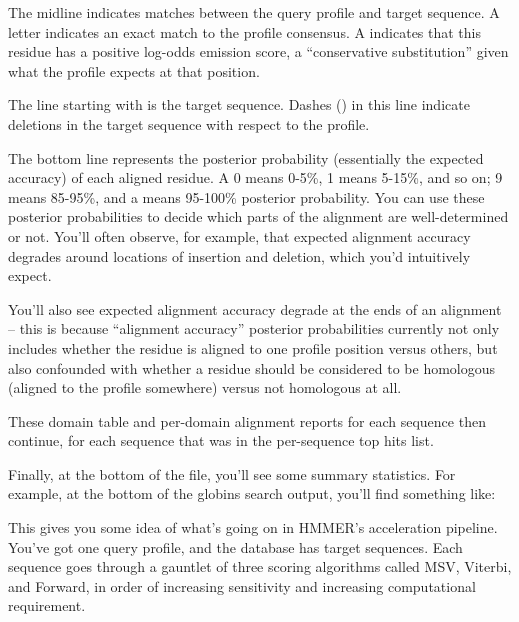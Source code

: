The midline indicates matches between the query profile and target
sequence. A letter indicates an exact match to the profile consensus.
A \mono{+} indicates that this residue has a positive log-odds
emission score, a ``conservative substitution'' given what the profile
expects at that position.

The line starting with  is the target sequence.
Dashes (\mono{-}) in this line indicate deletions in the target
sequence with respect to the profile.

The bottom line represents the posterior
probability (essentially the expected accuracy) of each aligned
residue. A 0 means 0-5\%, 1 means 5-15\%, and so on; 9 means 85-95\%,
and a \mono{*} means 95-100\% posterior probability. You can use these
posterior probabilities to decide which parts of the alignment are
well-determined or not. You'll often observe, for example, that
expected alignment accuracy degrades around locations of insertion and
deletion, which you'd intuitively expect. 

You'll also see expected alignment accuracy degrade at the ends of an
alignment -- this is because ``alignment accuracy'' posterior
probabilities currently not only includes whether the residue is
aligned to one profile position versus others, but also confounded with
whether a residue should be considered to be homologous (aligned to
the profile somewhere) versus not homologous at all.


These domain table and per-domain alignment reports for each sequence
then continue, for each sequence that was in the per-sequence top hits
list.

Finally, at the bottom of the file, you'll see some summary
statistics.  For example, at the bottom of the globins search output,
you'll find something like:


This gives you some idea of what's going on in HMMER's acceleration
pipeline. You've got one query profile, and the database has \UNInseq{}
target sequences. Each sequence goes through a gauntlet of three
scoring algorithms called MSV, Viterbi, and Forward, in order of 
increasing sensitivity and increasing computational requirement. 


